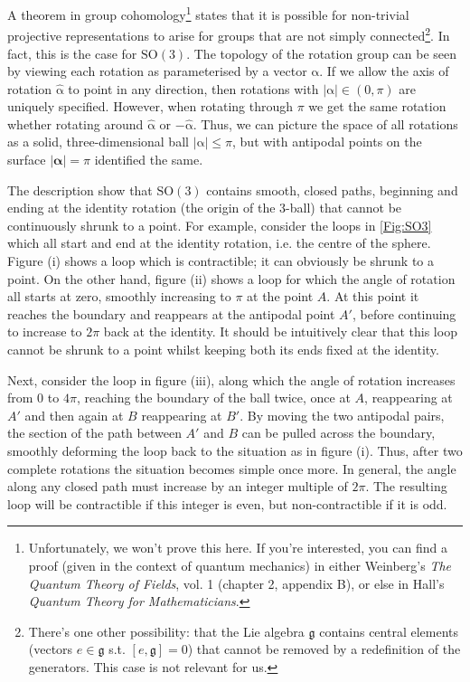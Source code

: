 \documentclass{article}
\theoremstyle{plain}\theoremheaderfont{\normalfont\itshape}\theorembodyfont{\rmfamily}\theoremseparator{.}\newtheorem*{rem}{Remark}\newtheorem*{ex}{Example}\newtheorem*{proof}{Proof}\newtheorem*{altp}{Alternative proof}
\theoremstyle{plain}\theoremheaderfont{\normalfont\bfseries}\theorembodyfont{\rmfamily}\theoremseparator{.}\newtheorem{thm}{Theorem}[section]\newtheorem{lem}[thm]{Lemma}\newtheorem{prop}[thm]{Proposition}\newtheorem*{cor}{Corollary}\newtheorem{defn}[thm]{Definition}\newtheorem{clm}[thm]{Claim}\newtheorem{clminproof}{Claim}
\theoremstyle{break}\theoremheaderfont{\normalfont\itshape}\theorembodyfont{\rmfamily}\theoremseparator{.\medskip}\newtheorem*{proofskip}{Proof}\newtheorem*{exs}{Examples}\newtheorem*{rems}{Remarks}
\theoremstyle{break}\theoremheaderfont{\normalfont\bfseries}\theorembodyfont{\rmfamily}\theoremseparator{.\medskip}\newtheorem{lemskip}[thm]{Lemma}\newtheorem{defnskip}[thm]{Definition}\newtheorem{propskip}[thm]{Proposition}\newtheorem{thmskip}[thm]{Theorem}
\numberwithin{equation}{section}
\newcommand{\vb}[1]{\bm{\mathrm{#1}}}
\newcommand{\vu}[1]{\hat{\bm{\mathrm{#1}}}}
\newcommand{\abs}[1]{\left| #1 \right|}
\newcommand{\SO}{\mathrm{SO}}
\begin{document}
    A theorem in group cohomology\footnote{Unfortunately, we won't prove this here. If you're interested, you can find a proof (given in the context of quantum mechanics) in either Weinberg's \textit{The Quantum Theory of Fields}, vol. 1 (chapter 2, appendix B), or else in Hall's \textit{Quantum Theory for Mathematicians}.} states that it is possible for non-trivial projective representations to arise for groups that are not simply connected\footnote{There's one other possibility: that the Lie algebra \(\mathfrak{g}\) contains central elements (vectors \(e\in\mathfrak{g}\) s.t. \([e,\mathfrak{g}]=0\)) that cannot be removed by a redefinition of the generators. This case is not relevant for us.}. In fact, this is the case for \(\SO(3)\). The topology of the rotation group can be seen by viewing each rotation as parameterised by a vector \(\vb{\alpha}\). If we allow the axis of rotation \(\vu{\alpha}\) to point in any direction, then rotations with \(\abs{\vb{\alpha}}\in(0,\pi)\) are uniquely specified. However, when rotating through \(\pi\) we get the same rotation whether rotating around \(\vu{\alpha}\) or \(-\vu{\alpha}\). Thus, we can picture the space of all rotations as a solid, three-dimensional ball \(\abs{\vb{\alpha}}\le\pi\), but with antipodal points on the surface \(\abs{\bm{\alpha}}=\pi\) identified the same.

    The description show that \(\SO(3)\) contains smooth, closed paths, beginning and ending at the identity rotation (the origin of the 3-ball) that cannot be continuously shrunk to a point. For example, consider the loops in \cref{Fig:SO3} which all start and end at the identity rotation, i.e.
    the centre of the sphere. Figure (i) shows a loop which is contractible; it can obviously be shrunk to a point. On the other hand, figure (ii) shows a loop for which the angle of rotation all starts at zero, smoothly increasing to \(\pi\) at the point \(A\). At this point it reaches the boundary and reappears at the antipodal point \(A'\), before continuing to increase to \(2\pi\) back at the identity. It should be intuitively clear that this loop cannot be shrunk to a point whilst keeping both its ends fixed at the identity.


    Next, consider the loop in figure (iii), along which the angle of rotation increases from \(0\) to \(4\pi\), reaching the boundary of the ball twice, once at \(A\), reappearing at \(A'\) and then again at \(B\) reappearing at \(B'\). By moving the two antipodal pairs, the section of the path between \(A'\) and \(B\) can be pulled across the boundary, smoothly deforming the loop back to the situation as in figure (i). Thus, after two complete rotations the situation becomes simple once more. In general, the angle along any closed path must increase by an integer multiple of \(2\pi\). The resulting loop will be contractible if this integer is even, but non-contractible if it is odd.
    
\end{document}
